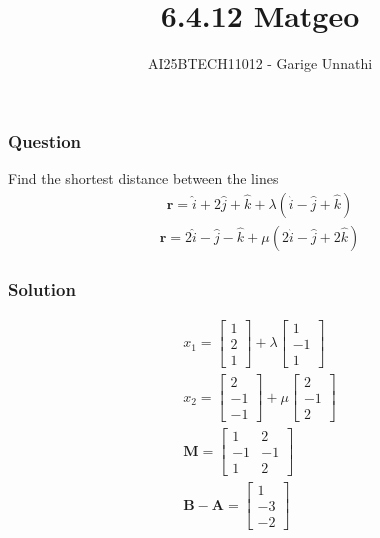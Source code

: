 \documentclass{beamer}
\title{6.4.12 Matgeo}
\author{AI25BTECH11012 - Garige Unnathi}
\date{}
\begin{document}
\frame{\titlepage}

\begin{frame}
\frametitle{Question}
Find the shortest distance between the lines
\begin{align*}
 \textbf{r} = \hat{i}+2\hat{j}+\hat{k} +\lambda(\hat{i}-\hat{j}+\hat{k})
\end{align*}
\begin{align*}
    \textbf{r} =  2\hat{i}-\hat{j}-\hat{k} +\mu(2\hat{i}-\hat{j}+2\hat{k})
\end{align*}

\end{frame}


\begin{frame}
\frametitle{Solution}
\begin{align}
\textbf{$x_1$} = \begin{bmatrix}1 \\2 \\1\end{bmatrix} + \lambda\begin{bmatrix}1 \\-1 \\1\end{bmatrix}\\
\textbf{$x_2$} = \begin{bmatrix}2 \\-1 \\-1\end{bmatrix} + \mu\begin{bmatrix}2 \\ -1\\ 2\end{bmatrix}\\
\textbf{M} = \begin{bmatrix}1 & 2 \\ -1 & -1\\1 & 2\end{bmatrix} \\
\textbf{B}-\textbf{A} = \begin{bmatrix}1 \\ -3 \\-2\end{bmatrix}
\end{align}
\end{frame}
\end{document}
